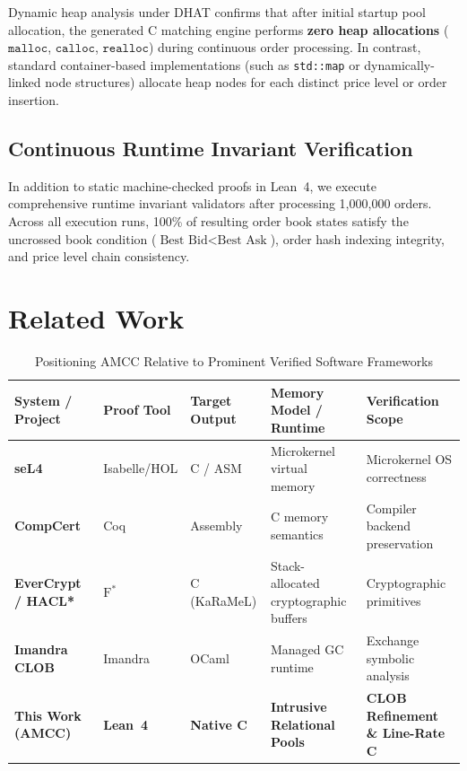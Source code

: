 \documentclass[11pt,a4paper]{article}
\begin{document}
Dynamic heap analysis under DHAT confirms that after initial startup pool allocation, the generated C matching engine performs \textbf{zero heap allocations} ($\mathtt{malloc}$, $\mathtt{calloc}$, $\mathtt{realloc}$) during continuous order processing. In contrast, standard container-based implementations (such as \texttt{std::map} or dynamically-linked node structures) allocate heap nodes for each distinct price level or order insertion.

\subsection{Continuous Runtime Invariant Verification}

In addition to static machine-checked proofs in Lean~4, we execute comprehensive runtime invariant validators after processing 1,000,000 orders. Across all execution runs, 100\% of resulting order book states satisfy the uncrossed book condition ($\text{Best Bid} < \text{Best Ask}$), order hash indexing integrity, and price level chain consistency.

\section{Related Work}
\label{sec:related}

\begin{table}[t]
\centering
\small
\caption{Positioning AMCC Relative to Prominent Verified Software Frameworks}
\label{tab:comparison}
\begin{tabularx}{\textwidth}{l>{\raggedright\arraybackslash}p{2.2cm}>{\raggedright\arraybackslash}p{2.2cm}>{\raggedright\arraybackslash}X>{\raggedright\arraybackslash}p{3.2cm}}
\toprule
\textbf{System / Project} & \textbf{Proof Tool} & \textbf{Target Output} & \textbf{Memory Model / Runtime} & \textbf{Verification Scope} \\
\midrule
\textbf{seL4}~\cite{seL4} & Isabelle/HOL & C / ASM & Microkernel virtual memory & Microkernel OS correctness \\
\textbf{CompCert}~\cite{compcert} & Coq & Assembly & C memory semantics & Compiler backend preservation \\
\textbf{EverCrypt / HACL*}~\cite{hacl_star} & $\mathrm{F}^*$ & C (KaRaMeL) & Stack-allocated cryptographic buffers & Cryptographic primitives \\
\textbf{Imandra CLOB}~\cite{clob_verification} & Imandra & OCaml & Managed GC runtime & Exchange symbolic analysis \\
\textbf{This Work (AMCC)} & \textbf{Lean~4} & \textbf{Native C} & \textbf{Intrusive Relational Pools} & \textbf{CLOB Refinement \& Line-Rate C} \\
\bottomrule
\end{tabularx}
\end{table}
\end{document}
